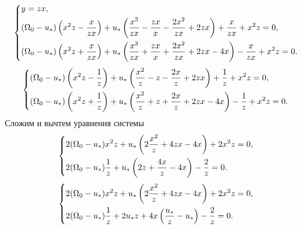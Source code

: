 \documentclass[a4paper,12pt, openany]{book}
\theoremstyle{plain} %
\theoremstyle{definition} %
\theoremstyle{remark} %
\numberwithin{equation}{chapter}
\begin{document}
{\begin{equation}\label{fullchanged1}
    \left\{ {\begin{aligned}
                 & y=zx, \hfill                                                                                                              \\
                 & (\Omega_0-u_*)\left( x^2z-\frac{x}{zx}\right)+u_*\left(\frac{x^3}{zx}-\frac{zx}{x}-\frac{2x^2}{zx}+2zx\right)+\frac{x}{zx}+x^2z=0, \hfill    \\
                 & (\Omega_0-u_*)\left( x^2z+\frac{x}{zx}\right)+u_*\left(\frac{x^3}{zx}+\frac{zx}{x}+\frac{2x^2}{zx}+2zx-4x\right)-\frac{x}{zx}+x^2z=0. \hfill \\
            \end{aligned}} \right.
\end{equation}
\begin{equation}\label{fullchanged1}
    \left\{ {\begin{aligned}
                 & (\Omega_0-u_*)\left( x^2z-\frac{1}{z}\right)+u_*\left(\frac{x^2}{z}-z-\frac{2x}{z}+2zx\right)+\frac{1}{z}+x^2z=0, \hfill    \\
                 & (\Omega_0-u_*)\left( x^2z+\frac{1}{z}\right)+u_*\left(\frac{x^2}{z}+z+\frac{2x}{z}+2zx-4x\right)-\frac{1}{z}+x^2z=0. \hfill \\
            \end{aligned}} \right.
\end{equation}
Сложим и вычтем уравнения системы
\begin{equation}\label{fullchanged2}
    \left\{ {\begin{aligned}
                 & 2(\Omega_0-u_*)x^2z+u_*\left(2\frac{x^2}{z}+4zx-4x\right)+2x^2z=0, \hfill    \\
                 & 2(\Omega_0-u_*)\frac{1}{z}+u_*\left(2z+\frac{4x}{z}-4x\right)-\frac{2}{z}=0. \hfill    \\
            \end{aligned}} \right.
\end{equation}
\begin{equation}\label{fullchanged2}
    \left\{ {\begin{aligned}
                 & 2(\Omega_0-u_*)x^2z+u_*\left(2\frac{x^2}{z}+4zx-4x\right)+2x^2z=0, \hfill    \\
                 & 2(\Omega_0-u_*)\frac{1}{z}+2u_*z+4x\left(\frac{u_*}{z}-u_*\right)-\frac{2}{z}=0. \hfill    \\
            \end{aligned}} \right.

\end{equation}}
\end{document}
